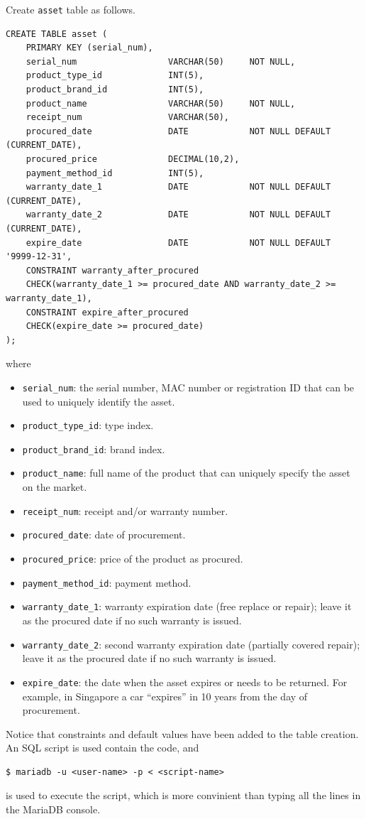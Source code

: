 Create \verb|asset| table as follows.
\begin{lstlisting}
CREATE TABLE asset (
	PRIMARY KEY (serial_num),
	serial_num                  VARCHAR(50)     NOT NULL,
	product_type_id             INT(5),
	product_brand_id            INT(5),
	product_name                VARCHAR(50)     NOT NULL,
	receipt_num                 VARCHAR(50),
	procured_date               DATE            NOT NULL DEFAULT (CURRENT_DATE),
	procured_price              DECIMAL(10,2),
	payment_method_id           INT(5),
	warranty_date_1             DATE            NOT NULL DEFAULT (CURRENT_DATE),
	warranty_date_2             DATE            NOT NULL DEFAULT (CURRENT_DATE),
	expire_date                 DATE            NOT NULL DEFAULT '9999-12-31',
	CONSTRAINT warranty_after_procured
	CHECK(warranty_date_1 >= procured_date AND warranty_date_2 >= warranty_date_1),
	CONSTRAINT expire_after_procured
	CHECK(expire_date >= procured_date)
);
\end{lstlisting}
where
\begin{itemize}
	\item \verb|serial_num|: the serial number, MAC number or registration ID that can be used to uniquely identify the asset.
	\item \verb|product_type_id|: type index.
	\item \verb|product_brand_id|: brand index.
	\item \verb|product_name|: full name of the product that can uniquely specify the asset on the market.
	\item \verb|receipt_num|: receipt and/or warranty number.
	\item \verb|procured_date|: date of procurement.
	\item \verb|procured_price|: price of the product as procured.
	\item \verb|payment_method_id|: payment method.
	\item \verb|warranty_date_1|: warranty expiration date (free replace or repair); leave it as the procured date if no such warranty is issued.
	\item \verb|warranty_date_2|: second warranty expiration date (partially covered repair); leave it as the procured date if no such warranty is issued.
	\item \verb|expire_date|: the date when the asset expires or needs to be returned. For example, in Singapore a car ``expires'' in 10 years from the day of procurement.
\end{itemize}
Notice that constraints and default values have been added to the table creation. An SQL script is used contain the code, and
\begin{lstlisting}
$ mariadb -u <user-name> -p < <script-name>
\end{lstlisting}
is used to execute the script, which is more convinient than typing all the lines in the MariaDB console.

